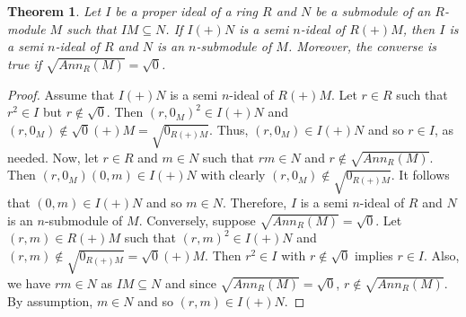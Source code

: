 \documentclass{amsart}%
\newtheorem{theorem}{Theorem}
\theoremstyle{plain}
\numberwithin{equation}{section}
\begin{document}
\begin{theorem}
\label{Ide}Let $I$ be a proper ideal of a ring $R$ and $N$ be a submodule of
an $R$-module $M$ such that $IM\subseteq N$. If $I(+)N$ is a semi $n$-ideal of
$R(+)M$, then $I$ is a semi $n$-ideal of $R$ and $N$ is an $n$-submodule of
$M$. Moreover, the converse is true if $\sqrt{Ann_{R}(M)}=\sqrt{0}$.
\end{theorem}

\begin{proof}
Assume that $I(+)N$ is a semi $n$-ideal of $R(+)M$. Let $r\in R$ such that
$r^{2}\in I$ but $r\notin\sqrt{0}$. Then $(r,0_{M})^{2}\in I(+)N$ and
$(r,0_{M})\notin\sqrt{0}(+)M=\sqrt{0_{R(+)M}}$. Thus, $(r,0_{M})\in I(+)N$ and
so $r\in I$, as needed. Now, let $r\in R$ and $m\in N$ such that $rm\in N$ and
$r\notin\sqrt{Ann_{R}(M)}$. Then $(r,0_{M})(0,m)\in I(+)N$ with clearly
$(r,0_{M})\notin\sqrt{0_{R(+)M}}$. It follows that $(0,m)\in I(+)N$ and so
$m\in N$. Therefore, $I$ is a semi $n$-ideal of $R$ and $N$ is an
$n$-submodule of $M$. Conversely, suppose $\sqrt{Ann_{R}(M)}=\sqrt{0}$. Let
$(r,m)\in R(+)M$ such that $(r,m)^{2}\in I(+)N$ and $(r,m)\notin
\sqrt{0_{R(+)M}}=\sqrt{0}(+)M$. Then $r^{2}\in I$ with $r\notin\sqrt{0}$
implies $r\in I$. Also, we have $rm\in N$ as $IM\subseteq N$ and since
$\sqrt{Ann_{R}(M)}=\sqrt{0}$, $r\notin\sqrt{Ann_{R}(M)}$. By assumption, $m\in
N$ and so $(r,m)\in I(+)N$.
\end{proof}
\end{document}
